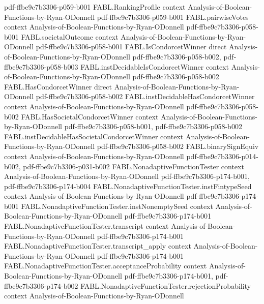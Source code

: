 \begin{theorem}
  {pdf-ffbe9c7b3306-p059-b001}
\proofstep
  {FABL.RankingProfile}
  {context}
  {Analysis-of-Boolean-Functions-by-Ryan-ODonnell}
  {pdf-ffbe9c7b3306-p059-b001}
\proofstep
  {FABL.pairwiseVotes}
  {context}
  {Analysis-of-Boolean-Functions-by-Ryan-ODonnell}
  {pdf-ffbe9c7b3306-p058-b001}
\proofstep
  {FABL.societalOutcome}
  {context}
  {Analysis-of-Boolean-Functions-by-Ryan-ODonnell}
  {pdf-ffbe9c7b3306-p058-b001}
\proofstep
  {FABL.IsCondorcetWinner}
  {direct}
  {Analysis-of-Boolean-Functions-by-Ryan-ODonnell}
  {pdf-ffbe9c7b3306-p058-b002,
    pdf-ffbe9c7b3306-p058-b003}
\proofstep
  {FABL.instDecidableIsCondorcetWinner}
  {context}
  {Analysis-of-Boolean-Functions-by-Ryan-ODonnell}
  {pdf-ffbe9c7b3306-p058-b002}
\proofstep
  {FABL.HasCondorcetWinner}
  {direct}
  {Analysis-of-Boolean-Functions-by-Ryan-ODonnell}
  {pdf-ffbe9c7b3306-p058-b002}
\proofstep
  {FABL.instDecidableHasCondorcetWinner}
  {context}
  {Analysis-of-Boolean-Functions-by-Ryan-ODonnell}
  {pdf-ffbe9c7b3306-p058-b002}
\proofstep
  {FABL.HasSocietalCondorcetWinner}
  {context}
  {Analysis-of-Boolean-Functions-by-Ryan-ODonnell}
  {pdf-ffbe9c7b3306-p058-b001,
    pdf-ffbe9c7b3306-p058-b002}
\proofstep
  {FABL.instDecidableHasSocietalCondorcetWinner}
  {context}
  {Analysis-of-Boolean-Functions-by-Ryan-ODonnell}
  {pdf-ffbe9c7b3306-p058-b002}
\proofstep
  {FABL.binarySignEquiv}
  {context}
  {Analysis-of-Boolean-Functions-by-Ryan-ODonnell}
  {pdf-ffbe9c7b3306-p014-b002,
    pdf-ffbe9c7b3306-p031-b002}
\proofstep
  {FABL.NonadaptiveFunctionTester}
  {context}
  {Analysis-of-Boolean-Functions-by-Ryan-ODonnell}
  {pdf-ffbe9c7b3306-p174-b001,
    pdf-ffbe9c7b3306-p174-b004}
\proofstep
  {FABL.NonadaptiveFunctionTester.instFintypeSeed}
  {context}
  {Analysis-of-Boolean-Functions-by-Ryan-ODonnell}
  {pdf-ffbe9c7b3306-p174-b001}
\proofstep
  {FABL.NonadaptiveFunctionTester.instNonemptySeed}
  {context}
  {Analysis-of-Boolean-Functions-by-Ryan-ODonnell}
  {pdf-ffbe9c7b3306-p174-b001}
\proofstep
  {FABL.NonadaptiveFunctionTester.transcript}
  {context}
  {Analysis-of-Boolean-Functions-by-Ryan-ODonnell}
  {pdf-ffbe9c7b3306-p174-b001}
\proofstep
  {FABL.NonadaptiveFunctionTester.transcript_apply}
  {context}
  {Analysis-of-Boolean-Functions-by-Ryan-ODonnell}
  {pdf-ffbe9c7b3306-p174-b001}
\proofstep
  {FABL.NonadaptiveFunctionTester.acceptanceProbability}
  {context}
  {Analysis-of-Boolean-Functions-by-Ryan-ODonnell}
  {pdf-ffbe9c7b3306-p174-b001,
    pdf-ffbe9c7b3306-p174-b002}
\proofstep
  {FABL.NonadaptiveFunctionTester.rejectionProbability}
  {context}
  {Analysis-of-Boolean-Functions-by-Ryan-ODonnell}

\end{theorem}
